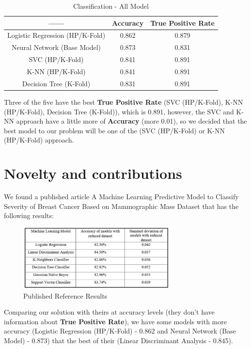 \documentclass[conference]{IEEEtran}
\begin{document}
\begin{table}[ht!]
    \centering
    \caption{Classification - All Model} 
    \begin{tabular}{||c| c | c ||} 
    \hline
     ------ & Accuracy & True Positive Rate \\ [0.5ex] 
     \hline\hline
     Logistic Regression (HP/K-Fold) & 0.862 & 0.879 \\
     \hline
    Neural Network (Base Model) & 0.873 & 0.831 \\ 
    \hline
    SVC (HP/K-Fold) & 0.841 & 0.891 \\ 
    \hline
    K-NN (HP/K-Fold) & 0.841 & 0.891 \\ 
    \hline
    Decision Tree (K-Fold) & 0.831 & 0.891 \\ 
    \hline
    \end{tabular}
    \label{tab:tab_comp_final}
\end{table}

Three of the five have the best \textbf{True Positive Rate} (SVC (HP/K-Fold), K-NN (HP/K-Fold), Decision Tree (K-Fold)), which is 0.891, however, the SVC and K-NN approach have a little more of \textbf{Accuracy} (more 0.01), so we decided that the best model to our problem will be one of the (SVC (HP/K-Fold) or K-NN (HP/K-Fold) approach.

\section{Novelty and contributions}

We found a published article A Machine Learning Predictive Model to Classify Severity of Breast Cancer Based on Mammographic Mass Dataset \cite{nov} that has the following results:

\begin{figure}[h!]
    \includegraphics[width=8cm]{novely_results.png}%
    \caption{Published Reference Results}%
    \label{fig:novely_result}%
\end{figure}

Comparing our solution with theirs at accuracy levels (they don't have information about \textbf{True Positive Rate}), we have some models with more accuracy (Logistic Regression (HP/K-Fold) - 0.862 and Neural Network (Base Model) - 0.873) that the best of their (Linear Discriminant Analysis - 0.845).
\end{document}
